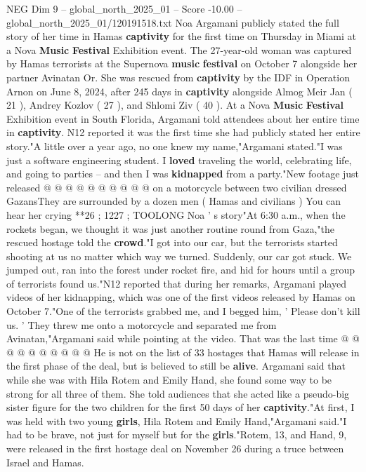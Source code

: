 \begin{textsample}{NEG Dim 9 – global\_north\_2025\_01 – Score -10.00 – global\_north\_2025\_01/120191518.txt}  \label{ex:f9_neg_024}
Noa Argamani publicly stated the full story of her time in Hamas \textbf{captivity} for the first time on Thursday in Miami at a Nova \textbf{Music} \textbf{Festival} Exhibition event.
The 27-year-old woman was captured by Hamas terrorists at the Supernova \textbf{music} \textbf{festival} on October 7 alongside her partner Avinatan Or.
She was rescued from \textbf{captivity} by the IDF in Operation Arnon on June 8, 2024, after 245 days in \textbf{captivity} alongside Almog Meir Jan ( 21 ), Andrey Kozlov ( 27 ), and Shlomi Ziv ( 40 ).
At a Nova \textbf{Music} \textbf{Festival} Exhibition event in South Florida, Argamani told attendees about her entire time in \textbf{captivity}.
N12 reported it was the first time she had publicly stated her entire story."A little over a year ago, no one knew my name,"Argamani stated."I was just a software engineering student.
I \textbf{loved} traveling the world, celebrating life, and going to parties -- and then I was \textbf{kidnapped} from a party."New footage just released @ @ @ @ @ @ @ @ @ @ on a motorcycle between two civilian dressed GazansThey are surrounded by a dozen men ( Hamas and civilians ) You can hear her crying **26 ; 1227 ; TOOLONG Noa ' s story"At 6:30 a.m., when the rockets began, we thought it was just another routine round from Gaza,"the rescued hostage told the \textbf{crowd}."I got into our car, but the terrorists started shooting at us no matter which way we turned.
Suddenly, our car got stuck.
We jumped out, ran into the forest under rocket fire, and hid for hours until a group of terrorists found us."N12 reported that during her remarks, Argamani played videos of her kidnapping, which was one of the first videos released by Hamas on October 7."One of the terrorists grabbed me, and I begged him, ' Please don't kill us. ' They threw me onto a motorcycle and separated me from Avinatan,"Argamani said while pointing at the video.
That was the last time @ @ @ @ @ @ @ @ @ @ He is not on the list of 33 hostages that Hamas will release in the first phase of the deal, but is believed to still be \textbf{alive}.
Argamani said that while she was with Hila Rotem and Emily Hand, she found some way to be strong for all three of them.
She told audiences that she acted like a pseudo-big sister figure for the two children for the first 50 days of her \textbf{captivity}."At first, I was held with two young \textbf{girls}, Hila Rotem and Emily Hand,"Argamani said."I had to be brave, not just for myself but for the \textbf{girls}."Rotem, 13, and Hand, 9, were released in the first hostage deal on November 26 during a truce between Israel and Hamas.

\end{textsample}
